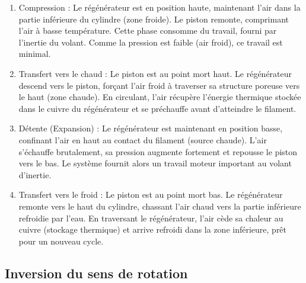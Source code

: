 \documentclass[a4paper,9pt,french]{scrartcl}
\begin{document}
\begin{enumerate}
    \item {Compression :} Le régénérateur est en position haute, maintenant l'air dans la partie inférieure du cylindre (zone froide). Le piston remonte, comprimant l'air à basse température. Cette phase consomme du travail, fourni par l'inertie du volant. Comme la pression est faible (air froid), ce travail est minimal.
    
    \item {Transfert vers le chaud :} Le piston est au point mort haut. Le régénérateur descend vers le piston, forçant l'air froid à traverser sa structure poreuse vers le haut (zone chaude). En circulant, l'air récupère l'énergie thermique stockée dans le cuivre du régénérateur et se préchauffe avant d'atteindre le filament.
    
    \item {Détente (Expansion) :} Le régénérateur est maintenant en position basse, confinant l'air en haut au contact du filament (source chaude). L'air s'échauffe brutalement, sa pression augmente fortement et repousse le piston vers le bas. Le système fournit alors un travail moteur important au volant d'inertie.
    
    \item {Transfert vers le froid :} Le piston est au point mort bas. Le régénérateur remonte vers le haut du cylindre, chassant l'air chaud vers la partie inférieure refroidie par l'eau. En traversant le régénérateur, l'air cède sa chaleur au cuivre (stockage thermique) et arrive refroidi dans la zone inférieure, prêt pour un nouveau cycle.
\end{enumerate}

\subsection{Inversion du sens de rotation}
\end{document}
